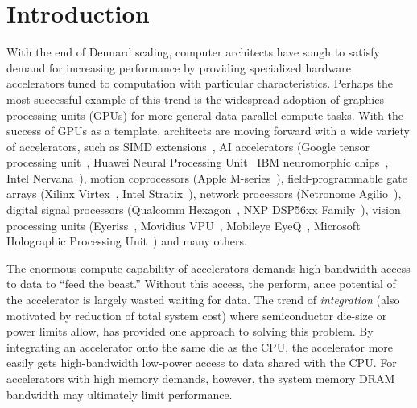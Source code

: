 \chapter{Introduction}
\label{ch:introduction}


With the end of Dennard scaling, computer architects have sough to satisfy demand for increasing performance by providing specialized hardware accelerators tuned to computation with particular characteristics.
Perhaps the most successful example of this trend is the widespread adoption of graphics processing units (GPUs) for more general data-parallel compute tasks.
With the success of GPUs as a template, architects are moving forward with a wide variety of accelerators, such as
SIMD extensions~\cite{intel2017avx, matz2013sse, arm2017neon},
AI accelerators (Google tensor processing unit~\cite{jouppi2017datacenter}, Huawei Neural Processing Unit~\cite{huawei2017kirin} IBM neuromorphic chips~\cite{merolla2014million}, Intel Nervana~\cite{intel2017nervana}),
motion coprocessors (Apple M-series~\cite{kandangath2015coremotion}),
field-programmable gate arrays (Xilinx Virtex~\cite{xilinx2018virtex}, Intel Stratix~\cite{intel2018stratix}), 
network processors (Netronome Agilio~\cite{netronome2018agilio}),
digital signal processors (Qualcomm Hexagon~\cite{codrescu2013hexagon}, NXP DSP56xx Family~\cite{nxp2018dsp}),
vision processing units (Eyeriss~\cite{chen2017eyeriss}, Movidius VPU~\cite{movidius2018vpu}, Mobileye EyeQ~\cite{mobileye2018eyeq}, Microsoft Holographic Processing Unit~\cite{microsoft2018hpu})
and many others.

The enormous compute capability of accelerators demands high-bandwidth access to data to ``feed the beast.''
Without this access, the perform, ance potential of the accelerator is largely wasted waiting for data.
The trend of \textit{integration} (also motivated by reduction of total system cost) where semiconductor die-size or power limits allow, has provided one approach to solving this problem.
By integrating an accelerator onto the same die as the CPU, the accelerator more easily gets high-bandwidth low-power access to data shared with the CPU.
For accelerators with high memory demands, however, the system memory DRAM bandwidth may ultimately limit performance.

